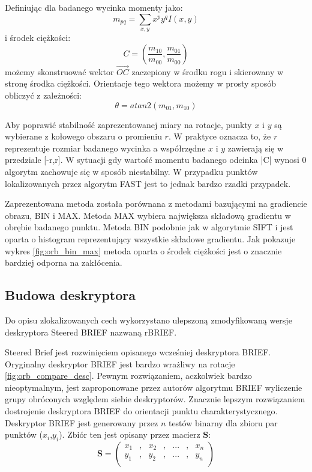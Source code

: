 Definiując dla badanego wycinka momenty jako:
\begin{equation}
m_{pq} = \sum\limits_{x,y} x^p y^q I(x,y)
\end{equation}
i środek ciężkości:
\begin{equation}
C = \left(\frac{m_{10}}{m_{00}},\frac{m_{01}}{m_{00}}\right)
\end{equation}
możemy skonstruować wektor $\overrightarrow{OC}$ zaczepiony w środku rogu i skierowany w stronę środka ciężkości. Orientacje tego wektora możemy w prosty sposób obliczyć z zależności:
\begin{equation}
\theta = atan2(m_{01},m_{10})
\end{equation}

Aby poprawić stabilność zaprezentowanej miary na rotacje, punkty $x$ i $y$ są wybierane z kołowego obszaru o promieniu $r$. W praktyce oznacza to, że $r$ reprezentuje rozmiar badanego wycinka a współrzędne $x$ i $y$ zawierają się w przedziale [-r,r]. W sytuacji gdy wartość momentu badanego odcinka |C| wynosi 0 algorytm zachowuje się w sposób niestabilny. W przypadku punktów lokalizowanych przez algorytm FAST jest to jednak bardzo rzadki przypadek.

Zaprezentowana metoda została porównana z metodami bazującymi na gradiencie obrazu, BIN i MAX. Metoda MAX wybiera największa składową gradientu w obrębie badanego punktu. Metoda BIN podobnie jak w algorytmie SIFT i jest oparta o histogram reprezentujący wszystkie składowe gradientu. Jak pokazuje wykres \ref{fig:orb_bin_max} metoda oparta o środek ciężkości jest o znacznie bardziej odporna na zakłócenia.
\subsection{Budowa deskryptora}
Do opisu zlokalizowanych cech wykorzystano ulepszoną zmodyfikowaną wersje deskryptora Steered BRIEF nazwaną rBRIEF. 

Steered Brief jest rozwinięciem opisanego wcześniej deskryptora BRIEF. Oryginalny deskryptor BRIEF jest bardzo wrażliwy na rotacje \ref{fig:orb_compare_desc}. Pewnym rozwiązaniem, aczkolwiek bardzo nieoptymalnym, jest zaproponowane przez autorów algorytmu BRIEF wyliczenie grupy obróconych względem siebie deskryptorów. Znacznie lepszym rozwiązaniem dostrojenie deskryptora BRIEF do orientacji punktu charakterystycznego. Deskryptor BRIEF jest generowany przez $n$ testów binarny dla zbioru par punktów ($x_i$,$y_i$). Zbiór ten jest opisany przez macierz $\textbf{S}$:
\begin{equation}
\textbf{S} = \left(\begin{array}{ccccccc}
x_1 & , & x_2 & , & ... & , & x_n \\
y_1 & , & y_2 & , & ... & , & y_n \\
\end{array}
\right)
\end{equation} 

